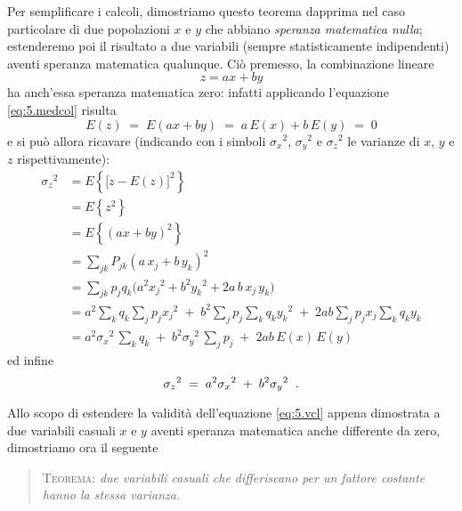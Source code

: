 Per semplificare i calcoli, dimostriamo questo teorema
dapprima nel caso particolare di due popolazioni $x$ e $y$
che abbiano \emph{speranza matematica nulla}; estenderemo
poi il risultato a due variabili (sempre statisticamente
indipendenti) aventi speranza matematica qualunque.  Ci\`o
premesso, la combinazione lineare
\begin{equation*}
  z = a x + b y
\end{equation*}
ha anch'essa speranza matematica zero: infatti applicando
l'equazione \eqref{eq:5.medcol} risulta
\begin{equation*}
  E(z) \; = \; E(ax+by) \; = \; a \, E(x) +
  b \, E(y) \; = \; 0
\end{equation*}
e si pu\`o allora ricavare (indicando con i simboli
${\sigma_x}^2$, ${\sigma_y}^2$ e ${\sigma_z}^2$ le varianze
di $x$, $y$ e $z$ rispettivamente):
\begin{align*}
  {\sigma_z}^2 &= E \left \{ \bigl[ z -
      E(z) \bigr] ^2 \right \} \\[1ex]
    &= E \left\{ z^2 \right\} \\[1ex]
    &= E \left \{ \left( ax+by \right) ^2 \right
      \} \\[1ex]
    &= \sum \nolimits_{jk} P_{jk} \left( a \,
      x_j + b \, y_k \right) ^2 \\[1ex]
    &= \sum \nolimits_{jk} p_j q_k \bigl(
      a^2 {x_j}^2 + b^2 {y_k}^2 + 2 a \, b \,
      x_j \, y_k \bigr) \\[1ex]
    &= a^2 \sum \nolimits_k q_k
      \sum \nolimits_j p_j {x_j}^2 \; + \;
      b^2 \sum \nolimits_j p_j \sum \nolimits_k
      q_k {y_k}^2 \; + \; 2ab \sum \nolimits_j
      p_j x_j \sum \nolimits_k q_k y_k \\[1ex]
    &= a^2 {\sigma_x}^2 \, \sum \nolimits_k q_k
      \; + \; b^2 {\sigma_y}^2 \, \sum
      \nolimits_j p_j \; + \; 2 a b \, E(x) \,
      E(y)
\end{align*}
ed infine
\begin{equation} \label{eq:5.vcl}
  {\sigma_z}^2 \; = \; a^2 {\sigma_x}^2
    \; + \; b^2 {\sigma_y}^2 \;\; .
\end{equation}

Allo scopo di estendere la validit\`a dell'equazione
\eqref{eq:5.vcl} appena dimostrata a due variabili casuali
$x$ e $y$ aventi speranza matematica anche differente da
zero, dimostriamo ora il seguente
\begin{quote}
  \textsc{Teorema:}\label{def:5.varind} \textit{due
    variabili casuali che differiscano per un fattore
    costante hanno la stessa varianza.}
\end{quote}

